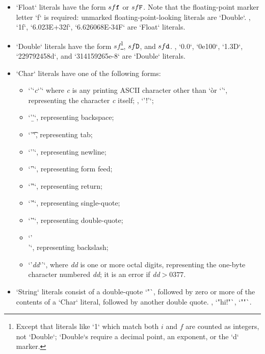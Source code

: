 \begin{itemize}
\item \xcd`Float` literals have the form {$s f {\tt f}$} or  {$s
\index{float!literal}
\index{literal!float}
      f {\tt F}$}.  Note that the floating-point marker letter \xcd`f` is
      required: unmarked floating-point-looking literals are \xcd`Double`. 
      \Eg, \xcd`1f`, \xcd`6.023E+32f`, \xcd`6.626068E-34F` are \xcd`Float`
      literals. 

\item \xcd`Double` literals have the form {$s f$}\footnote{Except that
      literals like \xcd`1` 
      which match both {$i$} and {$f$} are counted as
      integers, not \xcd`Double`; \xcd`Double`s require a decimal
      point, an exponent, or the \xcd`d` marker.
      }, {$s f {\tt
      D}$}, and {$s f {\tt d}$}.  
      \Eg, \xcd`0.0`, \xcd`0e100`, \xcd`1.3D`,  \xcd`229792458d`, and \xcd`314159265e-8`
      are \xcd`Double` literals.

\item 
{}
\xcd`Char` literals have one of the following forms: 
      \begin{itemize}
      \item \xcd`'`{\it c}\xcd`'` where {\em c} is any printing ASCII
            character other than 
            \xcd`\` or \xcd`'`, representing the character {\em c} itself; 
            \eg, \xcd`'!'`;
      \item \xcd`'\b'`, representing backspace;
      \item \xcd`'\t'`, representing tab;
      \item \xcd`'\n'`, representing newline;
      \item \xcd`'\f'`, representing form feed;
      \item \xcd`'\r'`, representing return;
      \item \xcd`'\''`, representing single-quote;
      \item \xcd`'\"'`, representing double-quote;
      \item \xcd`'\\'`, representing backslash;
      \item \xcd`'\`{\em dd}\xcd`'`, where {\em dd} is one or more octal
            digits, representing the one-byte character numbered {\em dd}; it
            is an error if {\em dd}{$>0377$}.      
      \end{itemize}

\item
{} 
\xcd`String` literals consist of a double-quote \xcd`"`, followed by
      zero or more of the contents of a \xcd`Char` literal, followed by
      another double quote.  \Eg, \xcd`"hi!"`, \xcd`""`.


\end{itemize}



